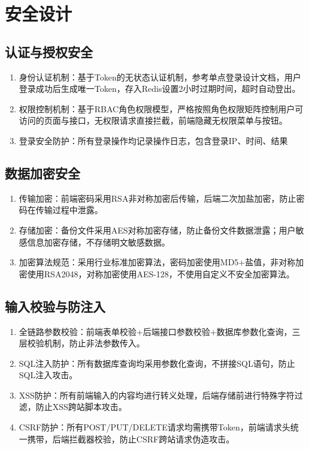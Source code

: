 \documentclass[12pt, a4paper]{article}
\begin{document}
\newpage
\section{安全设计}

\subsection{认证与授权安全}

\begin{enumerate}
\item  身份认证机制：基于Token的无状态认证机制，参考单点登录设计文档，用户登录成功后生成唯一Token，存入Redis设置2小时过期时间，超时自动登出。

\item  权限控制机制：基于RBAC角色权限模型，严格按照角色权限矩阵控制用户可访问的页面与接口，无权限请求直接拦截，前端隐藏无权限菜单与按钮。

\item  登录安全防护：所有登录操作均记录操作日志，包含登录IP、时间、结果
\end{enumerate}

\subsection{数据加密安全}

\begin{enumerate}
\item  传输加密：前端密码采用RSA非对称加密后传输，后端二次加盐加密，防止密码在传输过程中泄露。

\item  存储加密：备份文件采用AES对称加密存储，防止备份文件数据泄露；用户敏感信息加密存储，不存储明文敏感数据。

\item  加密算法规范：采用行业标准加密算法，密码加密使用MD5+盐值，非对称加密使用RSA2048，对称加密使用AES-128，不使用自定义不安全加密算法。
\end{enumerate}

\subsection{输入校验与防注入}

\begin{enumerate}
\item  全链路参数校验：前端表单校验+后端接口参数校验+数据库参数化查询，三层校验机制，防止非法参数传入。

\item  SQL注入防护：所有数据库查询均采用参数化查询，不拼接SQL语句，防止SQL注入攻击。

\item  XSS防护：所有前端输入的内容均进行转义处理，后端存储前进行特殊字符过滤，防止XSS跨站脚本攻击。

\item  CSRF防护：所有POST/PUT/DELETE请求均需携带Token，前端请求头统一携带，后端拦截器校验，防止CSRF跨站请求伪造攻击。
\end{enumerate}
\end{document}
